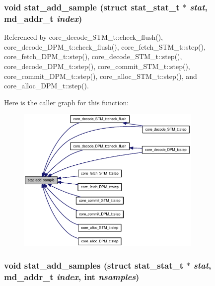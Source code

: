 \subsubsection[{stat\_\-add\_\-sample}]{\setlength{\rightskip}{0pt plus 5cm}void stat\_\-add\_\-sample (struct {\bf stat\_\-stat\_\-t} $\ast$ {\em stat}, \/  {\bf md\_\-addr\_\-t} {\em index})}\label{zesto_2stats_8h_702503b8068fdcce1dc8712be9791d42}




Referenced by core\_\-decode\_\-STM\_\-t::check\_\-flush(), core\_\-decode\_\-DPM\_\-t::check\_\-flush(), core\_\-fetch\_\-STM\_\-t::step(), core\_\-fetch\_\-DPM\_\-t::step(), core\_\-decode\_\-STM\_\-t::step(), core\_\-decode\_\-DPM\_\-t::step(), core\_\-commit\_\-STM\_\-t::step(), core\_\-commit\_\-DPM\_\-t::step(), core\_\-alloc\_\-STM\_\-t::step(), and core\_\-alloc\_\-DPM\_\-t::step().

Here is the caller graph for this function:\nopagebreak
\begin{figure}[H]
\begin{center}
\leavevmode
\includegraphics[width=252pt]{zesto_2stats_8h_702503b8068fdcce1dc8712be9791d42_icgraph}
\end{center}
\end{figure}
\subsubsection[{stat\_\-add\_\-samples}]{\setlength{\rightskip}{0pt plus 5cm}void stat\_\-add\_\-samples (struct {\bf stat\_\-stat\_\-t} $\ast$ {\em stat}, \/  {\bf md\_\-addr\_\-t} {\em index}, \/  int {\em nsamples})}\label{zesto_2stats_8h_d19289478f3e4e33e7b5a0caa68bd5b5}


